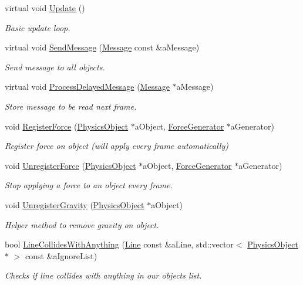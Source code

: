 \begin{DoxyCompactItemize}
virtual void \hyperlink{classPhysicsWorld_a8cb6d48d4de75cabc4e3943b16666200}{Update} ()
\begin{DoxyCompactList}\small\item\em Basic update loop. \end{DoxyCompactList}\item 
virtual void \hyperlink{classPhysicsWorld_a44d25e8d9d2e75e993e5bd0a550cc3aa}{Send\+Message} (\hyperlink{classMessage}{Message} const \&a\+Message)
\begin{DoxyCompactList}\small\item\em Send message to all objects. \end{DoxyCompactList}\item 
virtual void \hyperlink{classPhysicsWorld_a5ac21fa96d9b36b4c63ac9d2a9c64777}{Process\+Delayed\+Message} (\hyperlink{classMessage}{Message} $\ast$a\+Message)
\begin{DoxyCompactList}\small\item\em Store message to be read next frame. \end{DoxyCompactList}\item 
void \hyperlink{classPhysicsWorld_aac961ecf80d1367d5bb72089a5586e07}{Register\+Force} (\hyperlink{classPhysicsObject}{Physics\+Object} $\ast$a\+Object, \hyperlink{classForceGenerator}{Force\+Generator} $\ast$a\+Generator)
\begin{DoxyCompactList}\small\item\em Register force on object (will apply every frame automatically) \end{DoxyCompactList}\item 
void \hyperlink{classPhysicsWorld_abd1338674f3c5e92ea473cc090beb72e}{Unregister\+Force} (\hyperlink{classPhysicsObject}{Physics\+Object} $\ast$a\+Object, \hyperlink{classForceGenerator}{Force\+Generator} $\ast$a\+Generator)
\begin{DoxyCompactList}\small\item\em Stop applying a force to an object every frame. \end{DoxyCompactList}\item 
void \hyperlink{classPhysicsWorld_a75ae093ba230367aeba6f8221ae06ae0}{Unregister\+Gravity} (\hyperlink{classPhysicsObject}{Physics\+Object} $\ast$a\+Object)
\begin{DoxyCompactList}\small\item\em Helper method to remove gravity on object. \end{DoxyCompactList}\item 
bool \hyperlink{classPhysicsWorld_a7dfdf9dbd3b5ceeb42c530fb9a5b04a5}{Line\+Collides\+With\+Anything} (\hyperlink{structLine}{Line} const \&a\+Line, std\+::vector$<$ \hyperlink{classPhysicsObject}{Physics\+Object} $\ast$ $>$ const \&a\+Ignore\+List)
\begin{DoxyCompactList}\small\item\em Checks if line collides with anything in our objects list. \end{DoxyCompactList}\end{DoxyCompactItemize}
